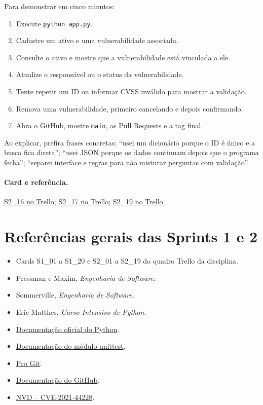 \documentclass[11pt,a4paper]{article}
\newcommand{\referencia}[2]{\paragraph{Card e referência.}\href{#1}{#2}}
\begin{document}
Para demonstrar em cinco minutos:
\begin{enumerate}
  \item Execute \texttt{python app.py}.
  \item Cadastre um ativo e uma vulnerabilidade associada.
  \item Consulte o ativo e mostre que a vulnerabilidade está vinculada a ele.
  \item Atualize o responsável ou o status da vulnerabilidade.
  \item Tente repetir um ID ou informar CVSS inválido para mostrar a validação.
  \item Remova uma vulnerabilidade, primeiro cancelando e depois confirmando.
  \item Abra o GitHub, mostre \texttt{main}, as Pull Requests e a tag final.
\end{enumerate}

Ao explicar, prefira frases concretas: ``usei um dicionário porque o ID é único e a busca fica direta''; ``usei JSON porque os dados continuam depois que o programa fecha''; ``separei interface e regras para não misturar perguntas com validação''.

\referencia{https://trello.com/c/UvtQ6Mc6}{S2\_16 no Trello}; \href{https://trello.com/c/FBSYXNJP}{S2\_17 no Trello}; \href{https://trello.com/c/ADSVtVQ4}{S2\_19 no Trello}.

\section{Referências gerais das Sprints 1 e 2}

\begin{itemize}
  \item Cards S1\_01 a S1\_20 e S2\_01 a S2\_19 do quadro Trello da disciplina.
  \item Pressman e Maxim, \emph{Engenharia de Software}.
  \item Sommerville, \emph{Engenharia de Software}.
  \item Eric Matthes, \emph{Curso Intensivo de Python}.
  \item \href{https://docs.python.org/3/}{Documentação oficial do Python}.
  \item \href{https://docs.python.org/3/library/unittest.html}{Documentação do módulo unittest}.
  \item \href{https://git-scm.com/book/pt-br/v2}{Pro Git}.
  \item \href{https://docs.github.com/}{Documentação do GitHub}.
  \item \href{https://nvd.nist.gov/vuln/detail/CVE-2021-44228}{NVD -- CVE-2021-44228}.
\end{itemize}
\end{document}
